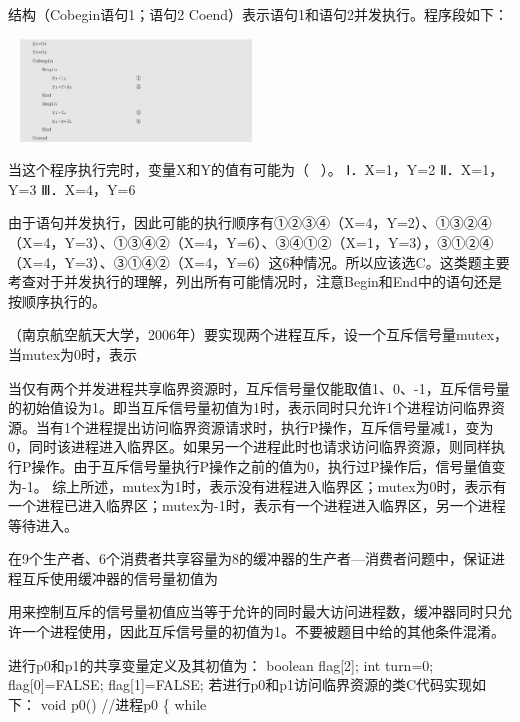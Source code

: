 \question 结构（Cobegin语句1；语句2 Coend）表示语句1和语句2并发执行。程序段如下：

~
\includegraphics[width=2.42708in,height=1.07292in]{computerassets/4DDE49E225C2295AEB3F23EAC5BBDEF5.png}

当这个程序执行完时，变量X和Y的值有可能为（ ~）。 Ⅰ．X=1，Y=2 Ⅱ．X=1，Y=3
Ⅲ．X=4，Y=6
\par{}
\begin{solution}由于语句并发执行，因此可能的执行顺序有①②③④（X=4，Y=2）、①③②④（X=4，Y=3）、①③④②（X=4，Y=6）、③④①②（X=1，Y=3），③①②④（X=4，Y=3）、③①④②（X=4，Y=6）这6种情况。所以应该选C。这类题主要考查对于并发执行的理解，列出所有可能情况时，注意Begin和End中的语句还是按顺序执行的。
\end{solution}
\question （南京航空航天大学，2006年）要实现两个进程互斥，设一个互斥信号量mutex，当mutex为0时，表示
\par{}
\begin{solution}当仅有两个并发进程共享临界资源时，互斥信号量仅能取值1、0、-1，互斥信号量的初始值设为1。即当互斥信号量初值为1时，表示同时只允许1个进程访问临界资源。当有1个进程提出访问临界资源请求时，执行P操作，互斥信号量减1，变为0，同时该进程进入临界区。如果另一个进程此时也请求访问临界资源，则同样执行P操作。由于互斥信号量执行P操作之前的值为0，执行过P操作后，信号量值变为-1。
综上所述，mutex为1时，表示没有进程进入临界区；mutex为0时，表示有一个进程已进入临界区；mutex为-1时，表示有一个进程进入临界区，另一个进程等待进入。
\end{solution}
\question 在9个生产者、6个消费者共享容量为8的缓冲器的生产者---消费者问题中，保证进程互斥使用缓冲器的信号量初值为
\par{}
\begin{solution}用来控制互斥的信号量初值应当等于允许的同时最大访问进程数，缓冲器同时只允许一个进程使用，因此互斥信号量的初值为1。不要被题目中给的其他条件混淆。
\end{solution}
\question 进行p0和p1的共享变量定义及其初值为： boolean flag{[}2{]}; int turn=0;
flag{[}0{]}=FALSE; flag{[}1{]}=FALSE;
若进行p0和p1访问临界资源的类C代码实现如下： void p0() //进程p0 \{ while
